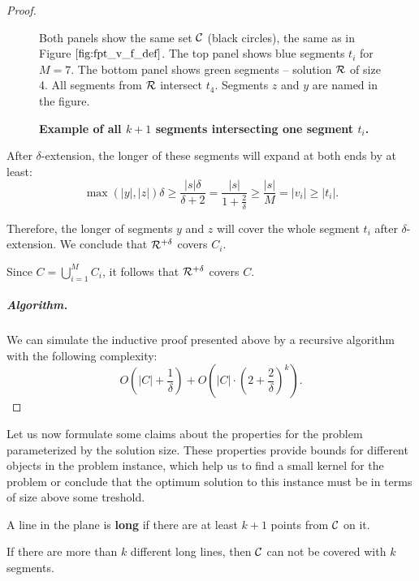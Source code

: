 \begin{proof}
\begin{figure}[h]
\begin{center}
\def\svgwidth{\columnwidth}

\end{center}
\caption{\textbf{Example of all $k+1$ segments intersecting one segment $t_i$.}}
Both panels show the same set $\mathcal{C}$ (black circles),
the same as in Figure $\ref{fig:fpt_v_f_def}$.
The top panel shows blue segments $t_i$ for $M=7$.
The bottom panel shows green segments -- solution $\mathcal{R}$ of size 4.
All segments from $\mathcal{R}$ intersect $t_4$.
Segments $z$ and $y$ are named in the figure.
\label{fig:fpt_tricky_case}
\end{figure}

After $\delta$-extension, the longer of these segments will
expand at both ends by at least:
$$\max(|y|, |z|)\delta \ge \frac{|s|\delta}{\delta+2} =
\frac{|s|}{1+\frac{2}{\delta}} \ge \frac{|s|}{M} = |v_i| \ge |t_i|.$$

Therefore, the longer of segments $y$ and $z$ will cover the whole segment $t_i$
after $\delta$-extension. We conclude that $\mathcal{R}^{+\delta}$ covers $C_i$.

Since $C = \bigcup_{i=1}^M C_i$,
it follows that $\mathcal{R}^{+\delta}$ covers $C$.


\subparagraph{Algorithm.}

We can simulate the inductive proof presented above by a recursive algorithm with
the following complexity:
$$O\left(|C|+\frac{1}{\delta}\right) + O\left(|C|\cdot\left(2+\frac{2}{\delta}\right)^k\right).$$

\end{proof}

Let us now formulate some claims about the
properties for the problem parameterized by the solution size.
These properties provide bounds for different
objects in the problem instance,
which help us to find a small kernel for the problem
or conclude that the optimum
solution to this instance must be in terms of size above some treshold.

\begin{defi}
A line in the plane is \textbf{long}
if there are at least $k+1$ points from $\mathcal{C}$ on it.
\end{defi}

\begin{claim}
\label{few_long_lines}
If there are more than $k$ different long lines, then 
$\mathcal{C}$ can not be covered with $k$ segments.
\end{claim}

